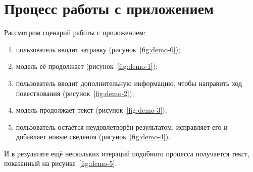 \section{Процесс работы с приложением}

Рассмотрим сценарий работы с приложением:
\begin{enumerate}
    \item пользователь вводит затравку (рисунок \ref*{fig:demo-0});
    \item модель её продолжает (рисунок \ref*{fig:demo-1});
    \item пользователь вводит дополнительную информацию, чтобы направить ход повествования (рисунок \ref*{fig:demo-2});
    \item модель продолжает текст (рисунок \ref*{fig:demo-3});
    \item пользователь остаётся неудовлетворён результатом, исправляет его и добавляет новые сведения (рисунок \ref*{fig:demo-4}).
\end{enumerate}

И в результате ещё нескольких итераций подобного процесса получается текст, показанный на рисунке \ref*{fig:demo-5}.

